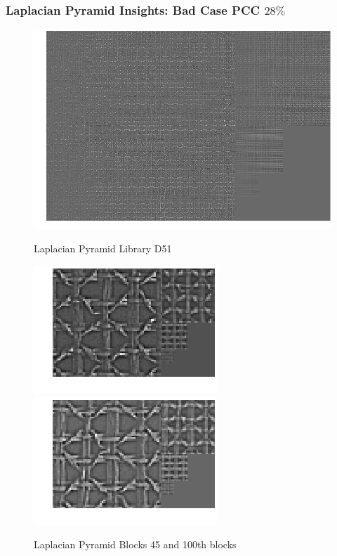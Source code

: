 \documentclass[11pt]{beamer}
\begin{document}
\begin{frame}
\begin{frame}
\frametitle{Laplacian Pyramid Insights: Bad Case PCC {$28\%$}}
\begin{figure}
\centering
\includegraphics[height=.4\textheight]{lap_bad/lib_k_7_sig_0_85_stat_2.png}\vfill
\caption{Laplacian Pyramid Library D51}
\includegraphics[height=.1\textheight]{lap_bad/k_7_sig_0_85_stat_2_blk_45.png}\vfill
\includegraphics[height=.1\textheight]{lap_bad/k_7_sig_0_85_stat_2_blk_100.png}
\caption{Laplacian Pyramid Blocks 45 and 100th blocks}
\end{figure}
\end{frame}


\end{frame}
\end{document}
